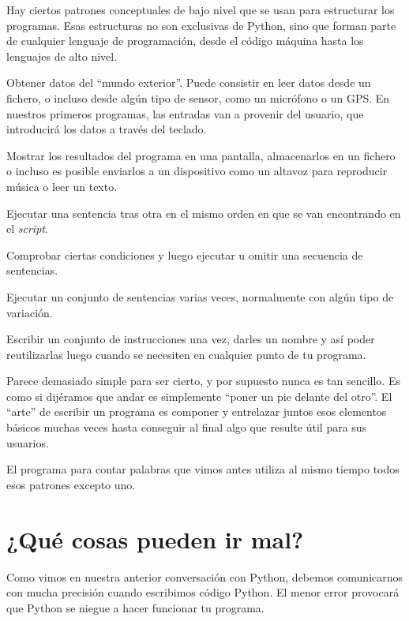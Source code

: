 Hay ciertos patrones conceptuales de bajo nivel que se usan para
estructurar los programas. Esas estructuras no son exclusivas de Python,
sino que forman parte de cualquier lenguaje de programación, desde el
código máquina hasta los lenguajes de alto nivel.

\begin{description}
\tightlist
\item[entrada]
Obtener datos del ``mundo exterior''. Puede consistir en leer datos
desde un fichero, o incluso desde algún tipo de sensor, como un
micrófono o un GPS. En nuestros primeros programas, las entradas van a
provenir del usuario, que introducirá los datos a través del teclado.
\item[salida]
Mostrar los resultados del programa en una pantalla, almacenarlos en un
fichero o incluso es posible enviarlos a un dispositivo como un altavoz
para reproducir música o leer un texto.
\item[ejecución secuencial]
Ejecutar una sentencia tras otra en el mismo orden en que se van
encontrando en el \emph{script}.
\item[ejecución condicional]
Comprobar ciertas condiciones y luego ejecutar u omitir una secuencia de
sentencias.
\item[ejecución repetida]
Ejecutar un conjunto de sentencias varias veces, normalmente con algún
tipo de variación.
\item[reutilización]
Escribir un conjunto de instrucciones una vez, darles un nombre y así
poder reutilizarlas luego cuando se necesiten en cualquier punto de tu
programa.
\end{description}

Parece demasiado simple para ser cierto, y por supuesto nunca es tan
sencillo. Es como si dijéramos que andar es simplemente ``poner un pie
delante del otro''. El ``arte'' de escribir un programa es componer y
entrelazar juntos esos elementos básicos muchas veces hasta conseguir al
final algo que resulte útil para sus usuarios.

El programa para contar palabras que vimos antes utiliza al mismo tiempo
todos esos patrones excepto uno.

\hypertarget{quuxe9-cosas-pueden-ir-mal}{%
\section{¿Qué cosas pueden ir
mal?}\label{quuxe9-cosas-pueden-ir-mal}}

Como vimos en nuestra anterior conversación con Python, debemos
comunicarnos con mucha precisión cuando escribimos código Python. El
menor error provocará que Python se niegue a hacer funcionar tu
programa.

